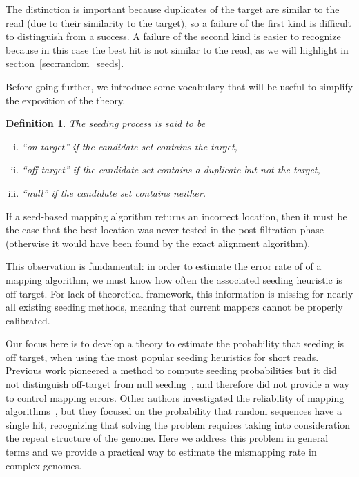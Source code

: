 \documentclass{article}
\newtheorem{definition}{Definition}
\begin{document}
The distinction is important because duplicates of the target are similar
to the read (due to their similarity to the target), so a failure of the
first kind is difficult to distinguish from a success. A failure of the
second kind is easier to recognize because in this case the best hit is
not similar to the read, as we will highlight in
section~\ref{sec:random_seeds}.

Before going further, we introduce some vocabulary that will be useful to
simplify the exposition of the theory.

\begin{definition}
The seeding process is said to be
\begin{enumerate}[i)]
\item ``on target'' if the candidate set contains the target,
\item ``off target'' if the candidate set contains a duplicate but
not the target, 
\item ``null'' if the candidate set contains neither.
\end{enumerate}
\end{definition}

If a seed-based mapping algorithm returns an incorrect location, then it
must be the case that the best location was never tested in the
post-filtration phase (otherwise it would have been found by the exact
alignment algorithm).

This observation is fundamental: in order to estimate the error rate of of
a mapping algorithm, we must know how often the associated seeding
heuristic is off target. For lack of theoretical framework, this
information is missing for nearly %
all existing seeding methods, meaning
that current mappers cannot be properly calibrated.

Our focus here is to develop a theory to estimate the probability that
seeding is off target, when using the most popular seeding heuristics for
short reads. Previous work pioneered a method to compute seeding
probabilities but it did not distinguish off-target from null
seeding~\cite{filion2017analytic,filion2018analytic}, and therefore did
not provide a way to control mapping errors. Other authors investigated
the reliability of mapping algorithms~\cite{pmid23872968}, but they
focused on the probability that random sequences have a single hit,
recognizing that solving the problem requires taking into consideration
the repeat structure of the genome. Here we address this problem in
general terms and we provide a practical way to estimate the mismapping
rate in complex genomes.
\end{document}
